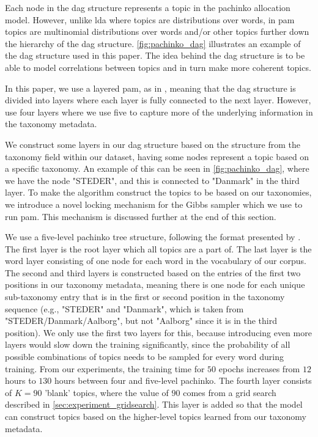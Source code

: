 Each node in the \gls{dag} structure represents a topic in the pachinko allocation model. 
However, unlike \gls{lda} where topics are distributions over words, in \gls{pam} topics are multinomial distributions over words and/or other topics further down the hierarchy of the \gls{dag} structure.
\autoref{fig:pachinko_dag} illustrates an example of the \gls{dag} structure used in this paper.
The idea behind the \gls{dag} structure is to be able to model correlations between topics and in turn make more coherent topics.
  
In this paper, we use a layered \gls{pam}, as in \cite{li2006pachinko}, meaning that the \gls{dag} structure is divided into layers where each layer is fully connected to the next layer.
However, \citet{li2006pachinko} use four layers where we use five to capture more of the underlying information in the taxonomy metadata.

We construct some layers in our \gls{dag} structure based on the structure from the taxonomy field within our dataset, having some nodes represent a topic based on a specific taxonomy.
An example of this can be seen in \autoref{fig:pachinko_dag}, where we have the node "STEDER", and this is connected to "Danmark" in the third layer.
To make the algorithm construct the topics to be based on our taxonomies, we introduce a novel locking mechanism for the Gibbs sampler which we use to run \gls{pam}.
This mechanism is discussed further at the end of this section.

We use a five-level pachinko tree structure, following the format presented by \citet{li2006pachinko}.
The first layer is the root layer which all topics are a part of.
The last layer is the word layer consisting of one node for each word in the vocabulary of our corpus.
The second and third layers is constructed based on the entries of the first two positions in our taxonomy metadata, meaning there is one node for each unique sub-taxonomy entry that is in the first or second position in the taxonomy sequence (e.g., "STEDER" and "Danmark", which is taken from "STEDER/Danmark/Aalborg", but not "Aalborg" since it is in the third position).
We only use the first two layers for this, because introducing even more layers would slow down the training significantly, since the probability of all possible combinations of topics needs to be sampled for every word during training.
From our experiments, the training time for $50$ epochs increases from $12$ hours to $130$ hours between four and five-level pachinko.
The fourth layer consists of $K = 90$ 'blank' topics, where the value of $90$ comes from a grid search described in \autoref{sec:experiment_gridsearch}.
This layer is added so that the model can construct topics based on the higher-level topics learned from our taxonomy metadata.


